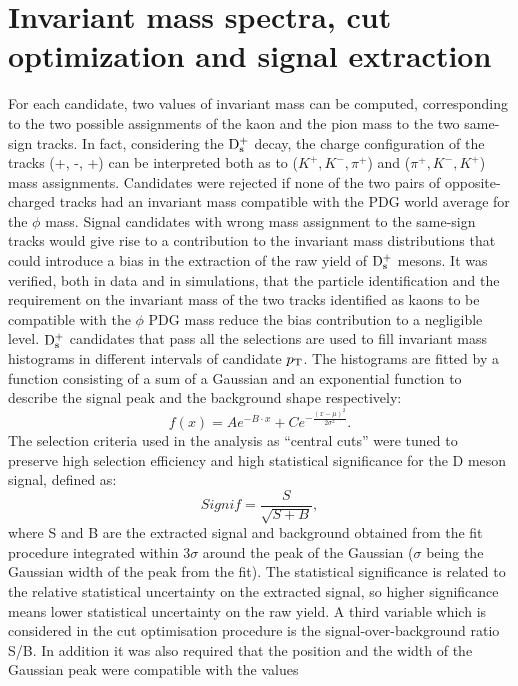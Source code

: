 \section{Invariant mass spectra, cut optimization and signal extraction}
\label{sec:invMassPlotsPP}
For each candidate, two values of invariant mass can be computed, 
corresponding to the two possible assignments of the kaon and the 
pion mass to the two same-sign tracks. In fact, considering the ${\rm D_s^+}$
 decay, the charge configuration of the tracks (+, -, +) can be interpreted
  both as to ($K^+,K^-,\pi^+$) and ($\pi^+,K^-,K^+$) mass assignments. 
     Candidates were rejected if none of the two pairs of opposite-charged 
   tracks had an invariant mass compatible with the PDG world average for the $\phi$ mass.
Signal candidates with 
  wrong mass assignment to the same-sign tracks would give rise to 
  a contribution to the invariant mass distributions that could introduce
   a bias in the extraction of the raw yield of ${\rm D_s^+}$ mesons.
   It was verified, both in data and in simulations, that the particle identification and the requirement 
   on the invariant mass of the two tracks identified as kaons to be compatible with the
$\phi$ PDG mass reduce the bias contribution to a negligible level.
${\rm D_s^+}$ candidates that pass all the selections are 
used to fill invariant mass histograms in different intervals of candidate $p_{\rm T}$.
The histograms are fitted by a function consisting of a sum of 
a Gaussian and an exponential function to describe the signal peak and 
the background shape respectively:
\begin{equation}
f(x)= Ae^{-B\cdot x}+Ce^{-\frac{(x-\mu)^2}{2\sigma^2}}.
\end{equation}
The selection criteria used in the analysis as  ``central cuts'' were tuned to 
preserve high selection efficiency and high statistical 
 significance for the D meson signal, defined as:
\[
Signif = \frac{S}{\sqrt{S+B}},
\]
where S and B are the extracted signal and background obtained 
from the fit procedure integrated within 3$\sigma$ 
around the peak of the Gaussian ($\sigma$ being the
Gaussian width of the peak from the fit). The statistical significance is related to the 
relative statistical uncertainty on the extracted signal, so higher 
significance means lower statistical uncertainty on the raw yield. 
A third variable which is considered in the cut optimisation procedure
 is the signal-over-background ratio S/B. In addition it was also
required that the position and the width 
  of the Gaussian peak were compatible with the values
